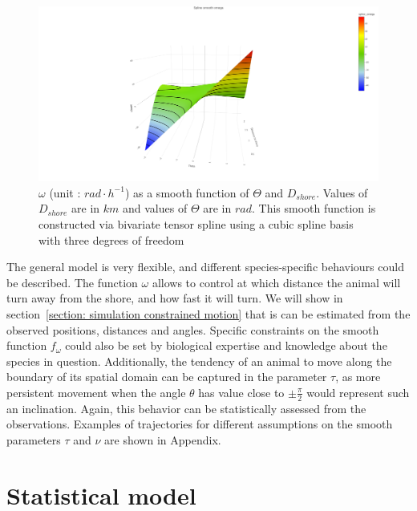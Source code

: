 \documentclass[11pt]{article}
\newcommand {\1}{\mathbb{1}}
\begin{document}
\begin{figure}[H]
		\centering
		\includegraphics[scale=0.25]{images/simulation study/spline_smooth_omega_rect.png}
		\caption{$\omega$ (unit : $rad \cdot h^{-1}$) as a smooth function of $\Theta$ and $D_{shore}$. Values of $D_{shore}$ are in $km$ and values of $\Theta$ are in $rad$.
		This smooth function is constructed via bivariate tensor spline using a cubic spline basis with three degrees of freedom}
	\label{fig: splineomega}
\end{figure}


 The general model is very flexible, and different species-specific behaviours could be described. The function $\omega$ allows to control at which distance the animal will turn away from the shore, and how fast it will turn. We will show in section~\ref{section: simulation constrained motion} that is can be estimated from the observed positions, distances and angles. Specific constraints on the smooth function $f_{\omega}$ could also be set by biological expertise and knowledge about the species in question. Additionally, the tendency of an animal to move along the boundary of its spatial domain can be captured in the parameter $\tau$, as more persistent movement when the angle $\theta$ has value close to $\pm\frac{\pi}{2}$ would represent such an inclination. Again, this behavior can be statistically assessed from the observations. Examples of trajectories for different assumptions on the smooth parameters $\tau$ and $\nu$ are shown in Appendix.








\section{Statistical model}
\end{document}
